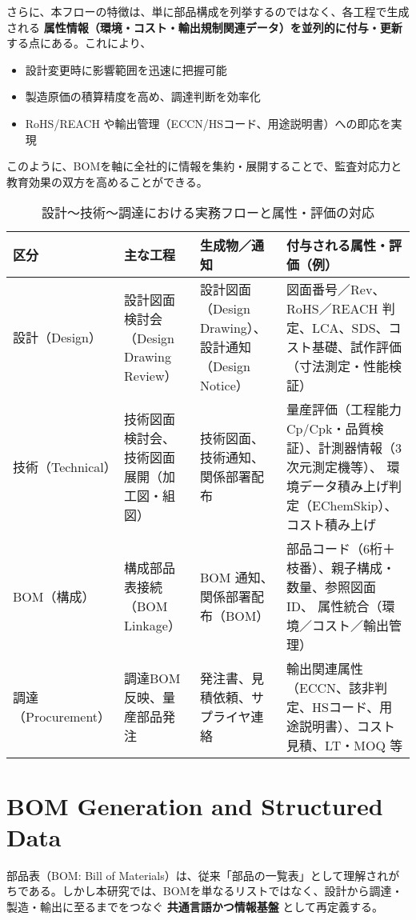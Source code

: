 \documentclass[10pt,conference]{IEEEtran}
\begin{document}
さらに、本フローの特徴は、単に部品構成を列挙するのではなく、各工程で生成される \textbf{属性情報（環境・コスト・輸出規制関連データ）を並列的に付与・更新} する点にある。これにより、
\begin{itemize}
  \item 設計変更時に影響範囲を迅速に把握可能
  \item 製造原価の積算精度を高め、調達判断を効率化
  \item RoHS/REACH や輸出管理（ECCN/HSコード、用途説明書）への即応を実現
\end{itemize}

このように、BOMを軸に全社的に情報を集約・展開することで、監査対応力と教育効果の双方を高めることができる。

\begin{table*}[t]
\centering
\caption{設計～技術～調達における実務フローと属性・評価の対応}
\label{tab:workflow_table}
\renewcommand{\arraystretch}{1.25}
\footnotesize
\begin{tabularx}{\linewidth}{@{}p{25mm} p{38mm} p{40mm} Y@{}}
\toprule
\textbf{区分} & \textbf{主な工程} & \textbf{生成物／通知} & \textbf{付与される属性・評価（例）} \\
\midrule
設計（Design） &
設計図面検討会（Design Drawing Review） &
設計図面（Design Drawing）、設計通知（Design Notice） &
図面番号／Rev、RoHS／REACH 判定、LCA、SDS、コスト基礎、試作評価（寸法測定・性能検証） \\
\midrule
技術（Technical） &
技術図面検討会、技術図面展開（加工図・組図） &
技術図面、技術通知、関係部署配布 &
量産評価（工程能力 Cp/Cpk・品質検証）、計測器情報（3次元測定機等）、
環境データ積み上げ判定（EChemSkip）、コスト積み上げ \\
\midrule
BOM（構成） &
構成部品表接続（BOM Linkage） &
BOM 通知、関係部署配布（BOM） &
部品コード（6桁＋枝番）、親子構成・数量、参照図面ID、
属性統合（環境／コスト／輸出管理） \\
\midrule
調達（Procurement） &
調達BOM反映、量産部品発注 &
発注書、見積依頼、サプライヤ連絡 &
輸出関連属性（ECCN、該非判定、HSコード、用途説明書）、コスト見積、LT・MOQ 等 \\
\bottomrule
\end{tabularx}
\end{table*}

\section{BOM Generation and Structured Data}
部品表（BOM: Bill of Materials）は、従来「部品の一覧表」として理解されがちである。しかし本研究では、BOMを単なるリストではなく、設計から調達・製造・輸出に至るまでをつなぐ \textbf{共通言語かつ情報基盤} として再定義する。
\end{document}
